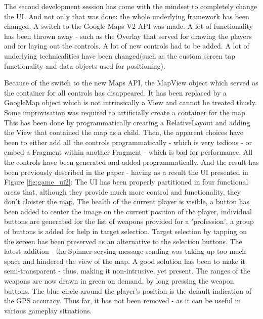 The second development session has come with the mindset to completely change
the UI. And not only that was done: the whole underlying framework has been
changed. A switch to the Google Maps V2 API was made. A lot of functionality has
been thrown away - such as the Overlay that served for drawing the players and
for laying out the controls. A lot of new controls had to be added. A lot of
underlying technicalities have been changed(such as the custom screen tap
functionality and data objects used for positioning).\newline

Because of the switch to the new Maps API, the MapView object which served as
the container for all controls has disappeared. It has been replaced by a
GoogleMap object which is not intrinsically a View and cannot be treated thusly.
Some improvisation was required to artificially create a container for the map.
This has been done by programmatically creating a RelativeLayout and adding the
View that contained the map as a child. Then, the apparent choices have been to
either add all the controls programmatically - which is very tedious - or embed
a Fragment within another Fragment - which is bad for performance. All the
controls have been generated and added programmatically. And the result has been
previously described in the paper - having as a result the UI presented in
Figure \ref{fig:game_ui2}: The UI has been properly partitioned in four
functional areas that, although they provide much more control and
functionality, they don't cloister the map. The health of the current player is
visible, a button has been added to center the image on the current position of
the player, individual buttons are generated for the list of weapons provided
for a 'profession', a group of buttons is added for help in target selection.
Target selection by tapping on the screen has been preserved as an alternative
to the selection buttons. The latest addition - the Spinner serving message
sending was taking up too much space and hindered the view of the map. A good
solution has been to make it semi-transparent - thus, making it non-intrusive,
yet present. The ranges of the weapons are now drawn in green on demand, by long
pressing the weapon buttons. The blue circle around the player's position is the
default indication of the GPS accuracy. Thus far, it has not been removed - as
it can be useful in various gameplay situations.\newline

